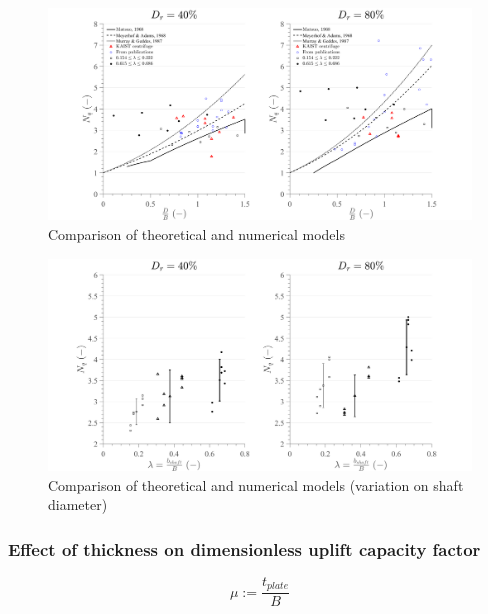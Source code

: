 \documentclass[a4paper, nobind]{templates/ociamthesis}
\begin{document}
\begin{figure}[H]
\includegraphics[width=1\linewidth]{myfigureeeeee/comparison_mu_1} \caption{Comparison of theoretical and numerical models}\label{fig:unnamed-chunk-50}
\end{figure}

\begin{figure}[H]
\includegraphics[width=1\linewidth]{myfigureeeeee/comparison_mu_2} \caption{Comparison of theoretical and numerical models (variation on shaft diameter)}\label{fig:unnamed-chunk-51}
\end{figure}

\hypertarget{effect-of-thickness-on-dimensionless-uplift-capacity-factor}{%
\subsubsection{Effect of thickness on dimensionless uplift capacity factor}\label{effect-of-thickness-on-dimensionless-uplift-capacity-factor}}

\[
\mu := \frac{t_{plate}}{B}
\]
\end{document}

